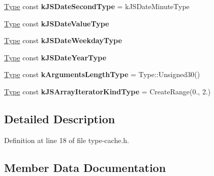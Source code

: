 \begin{DoxyCompactItemize}
\item 
\mbox{\label{classv8_1_1internal_1_1compiler_1_1TypeCache_ad169d5d93b7a8a504f3917c064d6b7ca}} 
\mbox{\hyperlink{classv8_1_1internal_1_1compiler_1_1Type}{Type}} const {\bfseries k\+J\+S\+Date\+Second\+Type} = k\+J\+S\+Date\+Minute\+Type
\item 
\mbox{\hyperlink{classv8_1_1internal_1_1compiler_1_1Type}{Type}} const {\bfseries k\+J\+S\+Date\+Value\+Type}
\item 
\mbox{\hyperlink{classv8_1_1internal_1_1compiler_1_1Type}{Type}} const {\bfseries k\+J\+S\+Date\+Weekday\+Type}
\item 
\mbox{\hyperlink{classv8_1_1internal_1_1compiler_1_1Type}{Type}} const {\bfseries k\+J\+S\+Date\+Year\+Type}
\item 
\mbox{\label{classv8_1_1internal_1_1compiler_1_1TypeCache_a5b9513f9f14985d5c520c174803d52b7}} 
\mbox{\hyperlink{classv8_1_1internal_1_1compiler_1_1Type}{Type}} const {\bfseries k\+Arguments\+Length\+Type} = Type\+::\+Unsigned30()
\item 
\mbox{\label{classv8_1_1internal_1_1compiler_1_1TypeCache_af02ed47814b4ecc97e3287af2d625912}} 
\mbox{\hyperlink{classv8_1_1internal_1_1compiler_1_1Type}{Type}} const {\bfseries k\+J\+S\+Array\+Iterator\+Kind\+Type} = Create\+Range(0., 2.)
\end{DoxyCompactItemize}


\subsection{Detailed Description}


Definition at line 18 of file type-\/cache.\+h.



\subsection{Member Data Documentation}
\mbox{\label{classv8_1_1internal_1_1compiler_1_1TypeCache_a2e603068650b3d143e18b10729ca4c29}} 
